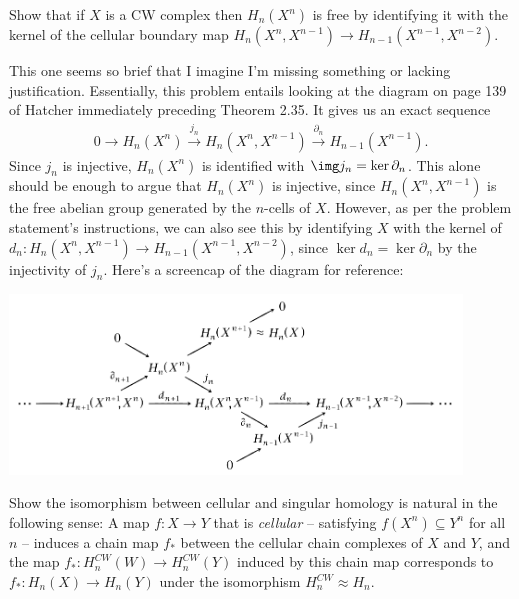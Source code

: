 \begin{homework}[e]
   Show that if $X$ is a CW complex then $H_n(X^n)$ is free by identifying it with the kernel of the cellular boundary map $H_n(X^n,X^{n-1})\to H_{n-1}(X^{n-1},X^{n-2})$.
  \begin{prf}
    This one seems so brief that I imagine I'm missing something or lacking justification. Essentially, this problem entails looking at the diagram on page 139 of Hatcher immediately preceding Theorem 2.35. It gives us an exact sequence
    \begin{align*}
      0 \to H_n(X^n) \xrightarrow{j_n} H_n(X^n,X^{n-1}) \xrightarrow{\partial_n} H_{n-1}(X^{n-1}).
    \end{align*}
    Since $j_n$ is injective, $H_n(X^n)$ is identified with $\img j_n = \ker \partial_n$. This alone should be enough to argue that $H_n(X^n)$ is injective, since $H_n(X^n,X^{n-1})$ is the free abelian group generated by the $n$-cells of $X$. However, as per the problem statement's instructions, we can also see this by identifying $X$ with the kernel of $d_n:H_n(X^n,X^{n-1})\to H_{n-1}(X^{n-1},X^{n-2})$, since $\ker d_n = \ker \partial_n$ by the injectivity of $j_n$. Here's a screencap of the diagram for reference:
    \begin{center}
      \includegraphics[width=12cm]{figures/hwk13-fig1.png}
      \label{fig:prob15-1}
    \end{center}
  \end{prf}
   Show the isomorphism between cellular and singular homology is natural in the following sense: A map $f:X\to Y$ that is \emph{cellular} -- satisfying $f(X^n) \subseteq Y^n$ for all $n$ -- induces a chain map $f_*$ between the cellular chain complexes of $X$ and $Y$, and the map $f_*:H_n^{CW}(W) \to H_n^{CW}(Y)$ induced by this chain map corresponds to $f_*:H_n(X) \to H_n(Y)$ under the isomorphism $H_n^{CW}\approx H_n$.
  \begin{prf}

\end{prf}
\end{homework}
